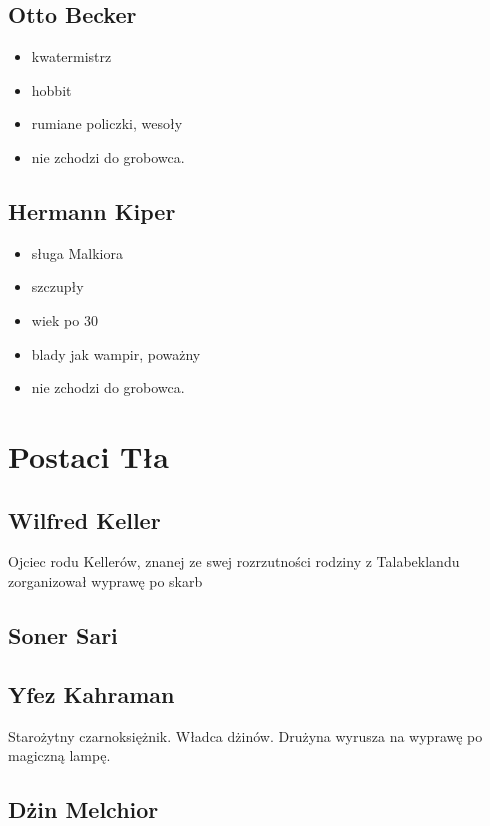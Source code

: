 \documentclass[11pt]{article}
\begin{document}
\subsection*{Otto Becker}
\label{sec-3.5}

\begin{itemize}
\item kwatermistrz
\item hobbit
\item rumiane policzki, wesoły
\item nie zchodzi do grobowca.
\end{itemize}
\subsection*{Hermann Kiper}
\label{sec-3.6}

\begin{itemize}
\item sługa Malkiora
\item szczupły
\item wiek po 30
\item blady jak wampir, poważny
\item nie zchodzi do grobowca.
\end{itemize}
\section*{Postaci Tła}
\label{sec-4}

\subsection*{Wilfred Keller}
\label{sec-4.1}

   Ojciec rodu Kellerów, znanej ze swej rozrzutności rodziny z
   Talabeklandu zorganizował wyprawę po skarb 
\subsection*{Soner Sari}
\label{sec-4.2}

\subsection*{Yfez Kahraman}
\label{sec-4.3}

   Starożytny czarnoksiężnik. Władca dżinów. Drużyna wyrusza na
   wyprawę po magiczną lampę.
\subsection*{Dżin Melchior}
\label{sec-4.4}
\end{document}
